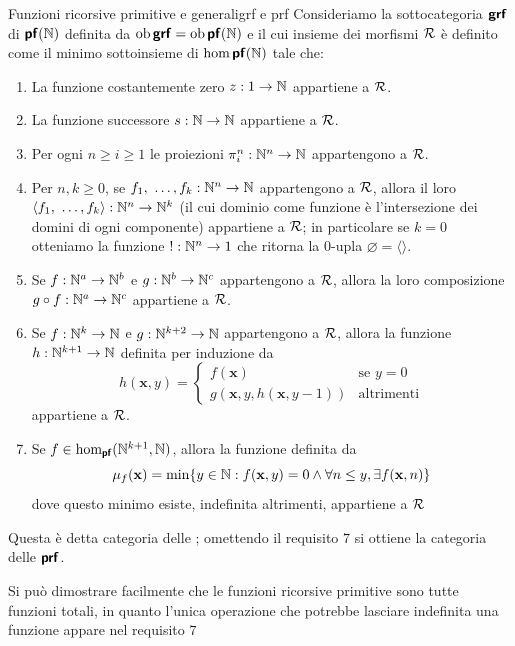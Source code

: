 \documentclass[openany]{book}
\begin{document}
\renewcommand\R{\mc{R}}
\begin{definition}{Funzioni ricorsive primitive e generali}{grf e prf}
    Consideriamo la sottocategoria $\text{\sffamily\textbf{grf}}$ di $\text{\sffamily\textbf{pf}}(\mathbb{N})$ definita da $\operatorname{ob}\text{\sffamily\textbf{grf}} = \operatorname{ob}\text{\sffamily\textbf{pf}}(\mathbb{N})$ e il cui insieme dei morfismi $\R$ è definito come il minimo sottoinsieme di $\hom\text{\sffamily\textbf{pf}}(\mathbb{N})$ tale che:\begin{enumerate}
        \item La funzione costantemente zero $z : 1 \to \mathbb{N}$ appartiene a $\R$.
        \item La funzione successore $s: \mathbb{N} \to \mathbb{N}$ appartiene a $\R$.
        \item Per ogni $n\ge i\ge 1$ le proiezioni $\pi_i^n : \mathbb{N}^n \to \mathbb{N}$ appartengono a $\R$.
        \item Per $n,k\ge 0$, se $f_1,\ \dots, f_k : \mathbb{N}^n\to\mathbb{N}$ appartengono a $\R$, allora il loro  $\langle f_1,\ \dots, f_k \rangle : \mathbb{N}^n\to\mathbb{N}^k$ (il cui dominio come funzione è l'intersezione dei domini di ogni componente) appartiene a $\R$; in particolare se $k=0$ otteniamo la funzione $!:\mathbb{N}^n\to 1$ che ritorna la $0$-upla $\varnothing = \langle\rangle$.
        \item Se $f:\mathbb{N}^a\to \mathbb{N}^b$ e $g: \mathbb{N}^b\to \mathbb{N}^c$ appartengono a $\R$, allora la loro composizione $g\circ f : \mathbb{N}^a\to\mathbb{N}^c$ appartiene a $\R$.
        \item Se $f: \mathbb{N}^k \to \mathbb{N}$ e $g : \mathbb{N}^{k+2}\to\mathbb{N}$ appartengono a $\R$, allora la funzione $h:\mathbb{N}^{k+1}\to\mathbb{N}$ definita per induzione da
        \[ h(\mathbf{x},y) = \begin{cases}
            f(\mathbf{x}) & \text{se }y=0 \\ g(\mathbf{x},y,h(\mathbf{x},y-1)) & \text{altrimenti}
        \end{cases}\]
        appartiene a $\R$.
        \item Se $f\in \hom_{\text{\sffamily\textbf{pf}}}(\mathbb{N}^{k+1},\mathbb{N})$, allora la funzione definita da
        \[ \mu_f(\mathbf{x}) = \min\{ y \in \mathbb{N} : f(\mathbf{x}, y) = 0 \wedge \forall n\le y, \exists f(\mathbf{x},n) \} \]
        dove questo minimo esiste, indefinita altrimenti, appartiene a $\R$
    \end{enumerate}
    Questa è detta categoria delle ; omettendo il requisito $7$ si ottiene la categoria delle  $\text{\sffamily\textbf{prf}}$.
\end{definition}

Si può dimostrare facilmente che le funzioni ricorsive primitive sono tutte funzioni totali, in quanto l'unica operazione che potrebbe lasciare indefinita una funzione appare nel requisito $7$
\end{document}
